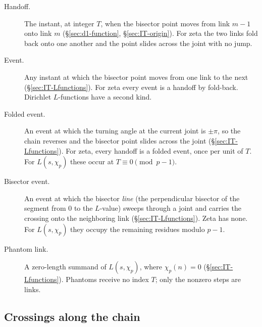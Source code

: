 \documentclass[11pt]{article}
\theoremstyle{definition}
\begin{document}
\begin{description}
\item[Handoff.]
The instant, at integer $T$, when the bisector point moves from
link $m-1$ onto link $m$
(\S\ref{sec:d1-function}, \S\ref{sec:IT-origin}).
For zeta the two links fold back onto one another and the point
slides across the joint with no jump.

\item[Event.]
Any instant at which the bisector point moves from one link to the
next (\S\ref{sec:IT-Lfunctions}).
For zeta every event is a handoff by fold-back.
Dirichlet $L$-functions have a second kind.

\item[Folded event.]
An event at which the turning angle at the current joint is
$\pm\pi$, so the chain reverses and the bisector point slides
across the joint (\S\ref{sec:IT-Lfunctions}).
For zeta, every handoff is a folded event, once per unit of $T$.
For $L(s,\chi_p)$ these occur at $T\equiv0\pmod{p-1}$.

\item[Bisector event.]
An event at which the bisector \emph{line} (the perpendicular
bisector of the segment from $0$ to the $L$-value) sweeps through
a joint and carries the crossing onto the neighboring link
(\S\ref{sec:IT-Lfunctions}).
Zeta has none.
For $L(s,\chi_p)$ they occupy the remaining residues modulo
$p-1$.

\item[Phantom link.]
A zero-length summand of $L(s,\chi_p)$, where $\chi_p(n)=0$
(\S\ref{sec:IT-Lfunctions}).
Phantoms receive no index $T$; only the nonzero steps are links.
\end{description}

\subsection*{Crossings along the chain}
\end{document}
